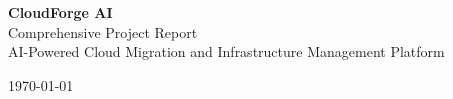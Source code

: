 \documentclass{report}
\begin{document}
\begin{titlepage}
    \centering
    \vspace*{1cm}
    
    {\LARGE\bfseries CloudForge AI}\\[0.5cm]
    {\Large Comprehensive Project Report}\\[0.5cm]
    {\large AI-Powered Cloud Migration and Infrastructure Management Platform}\\[2cm]
    
    \vfill
    
    {\large \today}
\end{titlepage}

\tableofcontents
\newpage













\end{document}
